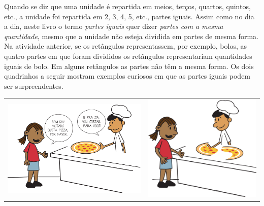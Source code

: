 \begin{refletindo*}[breakable]{}{}  
  Quando se diz que uma unidade é repartida em meios, terços, quartos, quintos, etc., a unidade foi repartida em 2, 3, 4, 5, etc., partes iguais.  
  Assim como no dia a dia, neste livro o termo   {\it partes iguais}   quer dizer   {\it partes com a mesma quantidade}, mesmo que a unidade não esteja dividida em partes de mesma forma.  
  Na atividade anterior, se os retângulos representassem, por exemplo, bolos, as quatro partes em que foram divididos os retângulos representariam quantidades iguais de bolo.   
  Em alguns retângulos as partes não têm a mesma forma.  
  Os dois quadrinhos a seguir mostram exemplos curiosos em que as partes iguais podem ser surpreendentes.
  
  \noindent\begin{tabular}{ll}
    \includegraphics[width=220pt, keepaspectratio]{..//media/cap1/secoes/pngs_licao_01/reflet_fig01.png} & \includegraphics[width=180pt, keepaspectratio]{..//media/cap1/secoes/pngs_licao_01/reflet_fig02.png}
  
  \end{tabular}
  \vspace{.5cm}
  \hline
  \vspace{.5cm}
  

\end{refletindo*}
